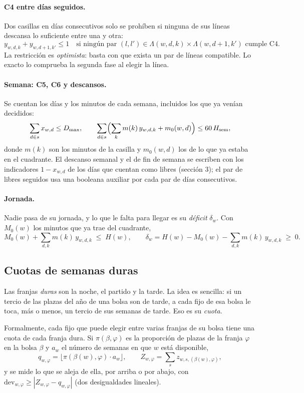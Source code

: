 \documentclass[11pt,a4paper]{article}
\begin{document}
\paragraph{C4 entre días seguidos.} Dos casillas en días consecutivos solo se prohíben si ninguna
de sus líneas descansa lo suficiente entre una y otra:
\[
  y_{w,d,k} + y_{w,d+1,k'} \le 1
  \quad \text{si ningún par } (l,l') \in \Lambda(w,d,k) \times \Lambda(w,d+1,k')
  \text{ cumple C4.}
\]
La restricción es \emph{optimista}: basta con que exista un par de líneas compatible. Lo exacto
lo comprueba la segunda fase al elegir la línea.

\paragraph{Semana: C5, C6 y descansos.} Se cuentan los días y los minutos de cada semana,
incluidos los que ya venían decididos:
\[
  \sum_{d \in s} x_{w,d} \le D_{\max},
  \qquad
  \sum_{d \in s} \Bigl( \sum_k m(k)\, y_{w,d,k} + m_0(w,d) \Bigr) \le 60\, H_{\mathrm{sem}},
\]
donde $m(k)$ son los minutos de la casilla y $m_0(w,d)$ los de lo que ya estaba en el
cuadrante. El descanso semanal y el de fin de semana se escriben con los indicadores
$1 - x_{w,d}$ de los días que cuentan como libres (sección 3); el par de libres seguidos usa una
booleana auxiliar por cada par de días consecutivos.

\paragraph{Jornada.} Nadie pasa de su jornada, y lo que le falta para llegar es su
\emph{déficit} $\delta_w$. Con $M_0(w)$ los minutos que ya trae del cuadrante,
\[
  M_0(w) + \sum_{d,k} m(k)\, y_{w,d,k} \;\le\; H(w),
  \qquad
  \delta_w = H(w) - M_0(w) - \sum_{d,k} m(k)\, y_{w,d,k} \;\ge\; 0.
\]

\subsection{Cuotas de semanas duras}

Las franjas \emph{duras} son la noche, el partido y la tarde. La idea es sencilla: si un tercio
de las plazas del año de una bolsa son de tarde, a cada fijo de esa bolsa le toca, más o menos,
un tercio de sus semanas de tarde. Eso es su \emph{cuota}.

Formalmente, cada fijo que puede elegir entre varias franjas de su bolsa tiene una cuota de cada
franja dura. Si $\pi(\beta,\varphi)$ es la proporción de plazas de la franja $\varphi$ en la
bolsa $\beta$ y $a_w$ el número de semanas en que $w$ está disponible,
\[
  q_{w,\varphi} = \bigl\lfloor \pi(\beta(w), \varphi) \cdot a_w \bigr\rfloor,
  \qquad
  Z_{w,\varphi} = \sum_s z_{w,s,(\beta(w),\varphi)},
\]
y se mide lo que se aleja de ella, por arriba o por abajo, con
$\mathrm{dev}_{w,\varphi} \ge |Z_{w,\varphi} - q_{w,\varphi}|$ (dos desigualdades lineales).
\end{document}
